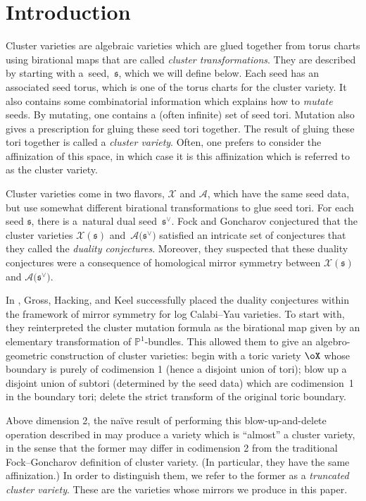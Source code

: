 \documentclass[pdftex]{sigma}%
\numberwithin{equation}{section}
\def\PP{\mathbb{P}}
\newcommand\frs{\mathfrak{s}}
\begin{document}
\section{Introduction}
Cluster varieties are algebraic varieties which are glued together from torus charts using birational maps that are called \emph{cluster transformations}. They are described by starting with a~seed,~$\frs$, which we will define below. Each seed has an associated seed torus, which is one of the torus charts for the cluster variety. It also contains some combinatorial information which explains how to \emph{mutate} seeds. By mutating, one contains a (often infinite) set of seed tori. Mutation also gives a prescription for gluing these seed tori together. The result of gluing these tori together is called a \emph{cluster variety}. Often, one prefers to consider the affinization of this space, in which case it is this affinization which is referred to as the cluster variety.

Cluster varieties come in two flavors, $\mathcal{X}$ and $\mathcal{A}$, which have the same seed data, but use somewhat different birational transformations to glue seed tori. For each seed $\frs$, there is a~natu\-ral dual seed~$\frs^\vee$. Fock and Goncharov conjectured that the cluster varieties $\mathcal{X}(\frs)$ and~$\mathcal{A}\big(\frs^\vee\big)$ satisfied an intricate set of conjectures that they called the \emph{duality conjectures}. Moreover, they suspected that these duality conjectures were a consequence of homological mirror symmetry between $\mathcal{X}(\frs)$ and $\mathcal{A}\big(\frs^\vee\big)$.

In \cite{GHK2, GHK1}, Gross, Hacking, and Keel successfully placed the duality conjectures within the framework of mirror symmetry for log Calabi--Yau varieties. To start with, they reinterpreted the cluster mutation formula as the birational map given by an elementary transformation of $\PP^1$-bundles. This allowed them to give an algebro-geometric construction of cluster varieties: begin with a toric variety $\oX$ whose boundary is purely of codimension 1 (hence a disjoint union of tori); blow up a disjoint union of subtori (determined by the seed data) which are codimension~1 in the boundary tori; delete the strict transform of the original toric boundary.

Above dimension 2, the na\"ive result of performing this blow-up-and-delete operation described in \cite{GHK2} may produce a variety which is ``almost'' a cluster variety, in the sense that the former may differ in codimension 2 from the traditional Fock--Goncharov definition of cluster variety. (In particular, they have the same affinization.) In order to distinguish them, we refer to the former as a {\it truncated cluster variety}. These are the varieties whose mirrors we produce in this paper.
\end{document}
